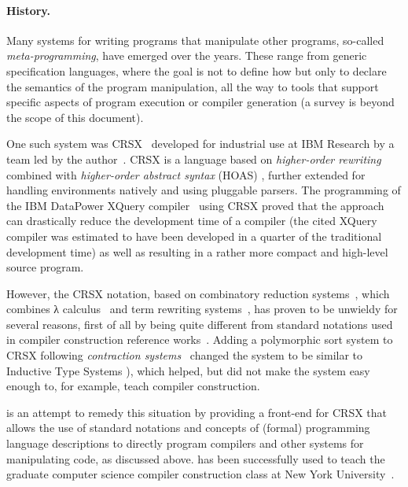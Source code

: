 \documentclass[11pt]{article} %
\begin{document}
\paragraph*{History.}

Many systems for writing programs that manipulate other programs, so-called \emph{meta-programming},
have emerged over the years. These range from generic specification languages, where the goal is not to
define how but only to declare the semantics of the program manipulation, all the way to tools that
support specific aspects of program execution or compiler generation (a survey is beyond the scope
of this document).

One such system was CRSX~\cite{Rose:1996} developed for industrial use at IBM Research by a team led
by the author~\cite{Rose:hor2007,Rose:hor2010,Rose:rta2011,crsx}.  CRSX is a language based on
\emph{higher-order rewriting}~\cite{Jouannaud:klop2005} combined with \emph{higher-order abstract
  syntax} (HOAS) \cite{PfenningElliot:pldi1988}, further extended for handling environments natively
and using pluggable parsers. The programming of the IBM Data\-Power XQuery
compiler~\cite{dp60:ibm2013} using CRSX proved that the approach can drastically reduce the
development time of a compiler (the cited XQuery compiler was estimated to have been developed in a
quarter of the traditional development time) as well as resulting in a rather more compact and
high-level source program.

However, the CRSX notation, based on combinatory reduction systems~\cite{Klop:1980,Klop+:tcs1993},
which combines λ calculus~\cite{Church:1941,Barendregt:1984} and term rewriting
systems~\cite{Klop:1992:Handbook}, has proven to be unwieldy for several reasons, first of all by
being quite different from standard notations used in compiler construction reference
works~\cite{Aho+:2006}. Adding a polymorphic sort system to CRSX following \emph{contraction
  systems}~\cite{Aczel:1978} changed the system to be similar to Inductive Type Systems
\cite{BlanquiJouannaudOkada:tcs2002}), which helped, but did not make the system easy enough to, for
example, teach compiler construction.

\HAX is an attempt to remedy this situation by providing a front-end for CRSX that allows the use of
standard notations and concepts of (formal) programming language descriptions to directly program
compilers and other systems for manipulating code, as discussed above. \HAX has been successfully
used to teach the graduate computer science compiler construction class at New York
University~\cite{RoseRose:cims2016}.
\end{document}
